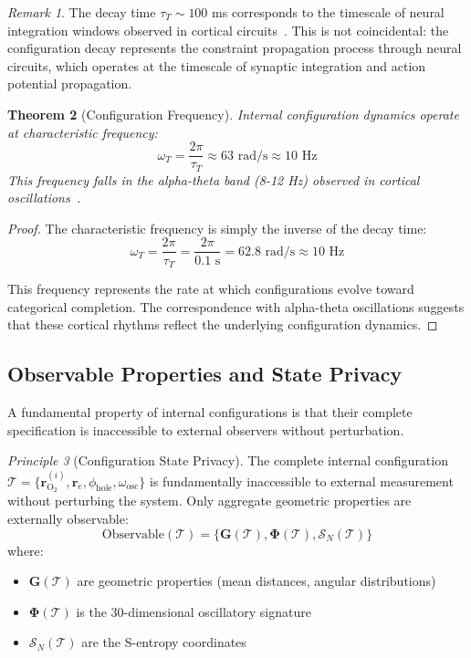 \documentclass[aps,prd,twocolumn,superscriptaddress,floatfix,nofootinbib]{revtex4-2}
\newtheorem{theorem}{Theorem}[section]
\theoremstyle{remark}
\newtheorem{remark}[theorem]{Remark}
\newtheorem{principle}[theorem]{Principle}
\begin{document}
\begin{remark}
The decay time $\tau_T \sim 100$ ms corresponds to the timescale of neural integration windows observed in cortical circuits~\cite{buzsaki2006rhythms}. This is not coincidental: the configuration decay represents the constraint propagation process through neural circuits, which operates at the timescale of synaptic integration and action potential propagation.
\end{remark}

\begin{theorem}[Configuration Frequency]
\label{thm:thought_freq}
Internal configuration dynamics operate at characteristic frequency:
\begin{equation}
\omega_T = \frac{2\pi}{\tau_T} \approx 63 \text{ rad/s} \approx 10 \text{ Hz}
\end{equation}
This frequency falls in the alpha-theta band (8-12 Hz) observed in cortical oscillations~\cite{buzsaki2004neuronal}.
\end{theorem}

\begin{proof}
The characteristic frequency is simply the inverse of the decay time:
$$
\omega_T = \frac{2\pi}{\tau_T} = \frac{2\pi}{0.1 \text{ s}} = 62.8 \text{ rad/s} \approx 10 \text{ Hz}
$$

This frequency represents the rate at which configurations evolve toward categorical completion. The correspondence with alpha-theta oscillations suggests that these cortical rhythms reflect the underlying configuration dynamics.
\end{proof}

\subsection{Observable Properties and State Privacy}

A fundamental property of internal configurations is that their complete specification is inaccessible to external observers without perturbation.

\begin{principle}[Configuration State Privacy]
\label{princ:privacy}
The complete internal configuration $\mathcal{T} = \{\mathbf{r}_{\text{O}_2}^{(i)}, \mathbf{r}_e, \phi_{\text{hole}}, \omega_{\text{osc}}\}$ is fundamentally inaccessible to external measurement without perturbing the system. Only aggregate geometric properties are externally observable:
\begin{equation}
\text{Observable}(\mathcal{T}) = \{\mathbf{G}(\mathcal{T}), \boldsymbol{\Phi}(\mathcal{T}), \mathcal{S}_N(\mathcal{T})\}
\end{equation}
where:
\begin{itemize}
\item $\mathbf{G}(\mathcal{T})$ are geometric properties (mean distances, angular distributions)
\item $\boldsymbol{\Phi}(\mathcal{T})$ is the 30-dimensional oscillatory signature
\item $\mathcal{S}_N(\mathcal{T})$ are the S-entropy coordinates
\end{itemize}
\end{principle}
\end{document}
